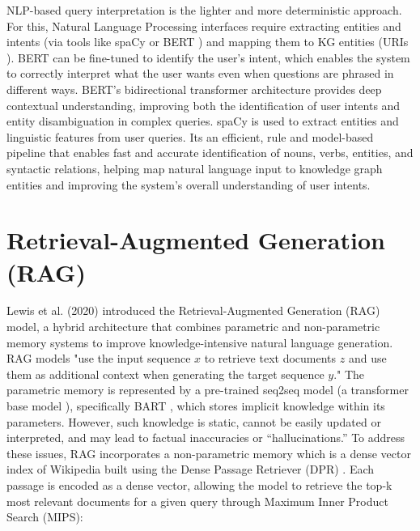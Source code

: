 \documentclass[conference]{IEEEtran}
\begin{document}
\noindent
NLP-based query interpretation is the lighter and more deterministic approach. For this, Natural Language Processing interfaces require extracting entities and intents (via tools like spaCy \cite{honnibal2020spacy} or BERT \cite{devlin2019bert}) and mapping them to KG entities (URIs \cite{KL2025slides}). BERT can be fine-tuned to identify the user’s intent, which enables the system to correctly interpret what the user wants even when questions are phrased in different ways. BERT's \cite{devlin2019bert} bidirectional transformer architecture provides deep contextual understanding, improving both the identification of user intents and entity disambiguation in complex queries. spaCy \cite{honnibal2020spacy} is used to extract entities and linguistic features from user queries. Its an efficient, rule and model-based pipeline that enables fast and accurate identification of nouns, verbs, entities, and syntactic relations, helping map natural language input to knowledge graph entities and improving the system's overall understanding of user intents.


\section{Retrieval-Augmented Generation (RAG)}

\noindent
Lewis et al. (2020) \cite{lewis2020rag} introduced the Retrieval-Augmented Generation (RAG) model, a hybrid architecture that combines parametric and non-parametric memory systems to improve knowledge-intensive natural language generation. RAG models "use the input sequence $x$ to retrieve text documents $z$ and use them
as additional context when generating the target sequence $y$."
The parametric memory is represented by a pre-trained seq2seq model \cite{sutskever2014sequence} (a transformer base model \cite{vaswani2017attention}), specifically BART \cite{lewis2019bart}, which stores implicit knowledge within its parameters. However, such knowledge is static, cannot be easily updated or interpreted, and may lead to factual inaccuracies or “hallucinations.” To address these issues, RAG incorporates a non-parametric memory which is a dense vector index of Wikipedia built using the Dense Passage Retriever (DPR) \cite{karpukhin2020dense_passage_retrieval}. Each passage is encoded as a dense vector, allowing the model to retrieve the top-k most relevant documents for a given query through Maximum Inner Product Search (MIPS):
\end{document}
